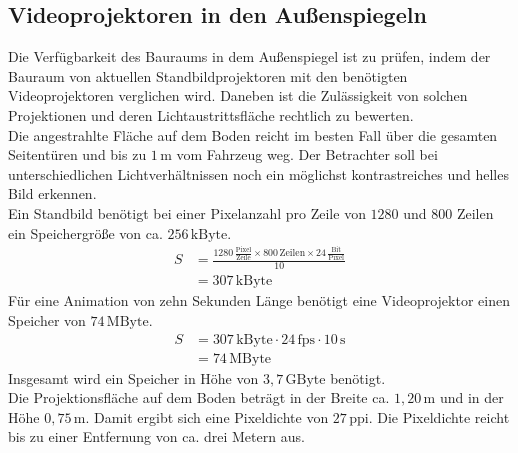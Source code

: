 \subsection{Videoprojektoren in den Außenspiegeln}
Die Verfügbarkeit des Bauraums in dem Außenspiegel ist zu prüfen, indem der Bauraum von aktuellen Standbildprojektoren mit den benötigten Videoprojektoren verglichen wird. 
Daneben ist die Zulässigkeit von solchen Projektionen und deren Lichtaustrittsfläche rechtlich zu bewerten. \\
Die angestrahlte Fläche auf dem Boden reicht im besten Fall über die gesamten Seitentüren und bis zu $ 1\,\mathrm{m} $ vom Fahrzeug weg.
Der Betrachter soll bei unterschiedlichen Lichtverhältnissen noch ein möglichst kontrastreiches und helles Bild erkennen. \\
Ein Standbild benötigt bei einer Pixelanzahl pro Zeile von $ 1280 $ und $ 800 $ Zeilen ein Speichergröße von ca. $ 256\,\mathrm{kByte}$. 
\begin{align}
	S &= \frac{1280\,\frac{\mathrm{Pixel}}{\mathrm{Zeile}} \times 800\,\mathrm{Zeilen} \times 24\,\frac{\mathrm{Bit}}{\mathrm{Pixel}}}{10} \\
	&= 307\,\mathrm{kByte}
\end{align}
Für eine Animation von zehn Sekunden Länge benötigt eine Videoprojektor einen Speicher von $ 74\,\mathrm{MByte}$.
\begin{align}
	S &= 307\,\mathrm{kByte} \cdot 24\,\mathrm{fps} \cdot 10\,\mathrm{s}\\
	&= 74\,\mathrm{MByte} 
\end{align}
Insgesamt wird ein Speicher in Höhe von $ 3,7\,\mathrm{GByte} $ benötigt. \\
Die Projektionsfläche auf dem Boden beträgt in der Breite ca. $ 1,20\,\mathrm{m} $ und in der Höhe $ 0,75\,\mathrm{m} $. Damit ergibt sich eine Pixeldichte von $ 27\,\mathrm{ppi} $. Die Pixeldichte reicht bis zu einer Entfernung von ca. drei Metern aus.
